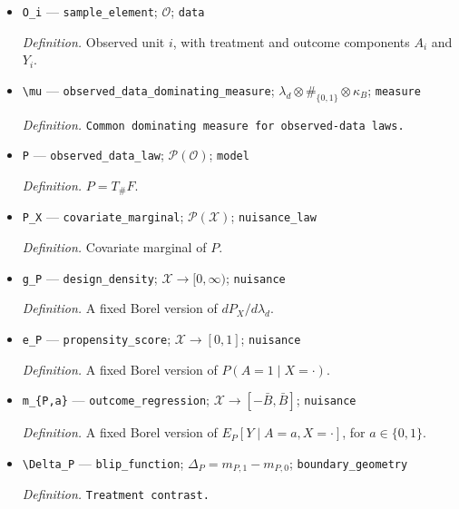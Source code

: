 \documentclass{article}
\begin{document}
\begin{itemize}
  \par\smallskip\noindent\emph{Definition.} \(O=T(W)=(X,A,Y(A))\).
  \item \texttt{O\_\allowbreak{}i} --- \texttt{sample\_\allowbreak{}element}; \(\mathcal O\); \texttt{data}
  \par\smallskip\noindent\emph{Definition.} Observed unit \(i\), with treatment and outcome components \(A_i\) and \(Y_i\).
  \item \texttt{\textbackslash{}\allowbreak{}mu} --- \texttt{observed\_\allowbreak{}data\_\allowbreak{}dominating\_\allowbreak{}measure}; \(\lambda_d\otimes\#_{\{0,1\}}\otimes\kappa_B\); \texttt{measure}
  \par\smallskip\noindent\emph{Definition.} \texttt{Common dominating measure for observed-\allowbreak{}data laws.}
  \item \texttt{P} --- \texttt{observed\_\allowbreak{}data\_\allowbreak{}law}; \(\mathcal P(\mathcal O)\); \texttt{model}
  \par\smallskip\noindent\emph{Definition.} \(P=T_\#F\).
  \item \texttt{P\_\allowbreak{}X} --- \texttt{covariate\_\allowbreak{}marginal}; \(\mathcal P(\mathcal X)\); \texttt{nuisance\_\allowbreak{}law}
  \par\smallskip\noindent\emph{Definition.} Covariate marginal of \(P\).
  \item \texttt{g\_\allowbreak{}P} --- \texttt{design\_\allowbreak{}density}; \(\mathcal X\to[0,\infty)\); \texttt{nuisance}
  \par\smallskip\noindent\emph{Definition.} A fixed Borel version of \(dP_X/d\lambda_d\).
  \item \texttt{e\_\allowbreak{}P} --- \texttt{propensity\_\allowbreak{}score}; \(\mathcal X\to[0,1]\); \texttt{nuisance}
  \par\smallskip\noindent\emph{Definition.} A fixed Borel version of \(P(A=1\mid X=\cdot)\).
  \item \texttt{m\_\allowbreak{}\{P,\allowbreak{}a\}\allowbreak{}} --- \texttt{outcome\_\allowbreak{}regression}; \(\mathcal X\to[-\bar B,\bar B]\); \texttt{nuisance}
  \par\smallskip\noindent\emph{Definition.} A fixed Borel version of \(E_P[Y\mid A=a,X=\cdot]\), for \(a\in\{0,1\}\).
  \item \texttt{\textbackslash{}\allowbreak{}Delta\_\allowbreak{}P} --- \texttt{blip\_\allowbreak{}function}; \(\Delta_P=m_{P,1}-m_{P,0}\); \texttt{boundary\_\allowbreak{}geometry}
  \par\smallskip\noindent\emph{Definition.} \texttt{Treatment contrast.}

\end{itemize}
\end{document}
